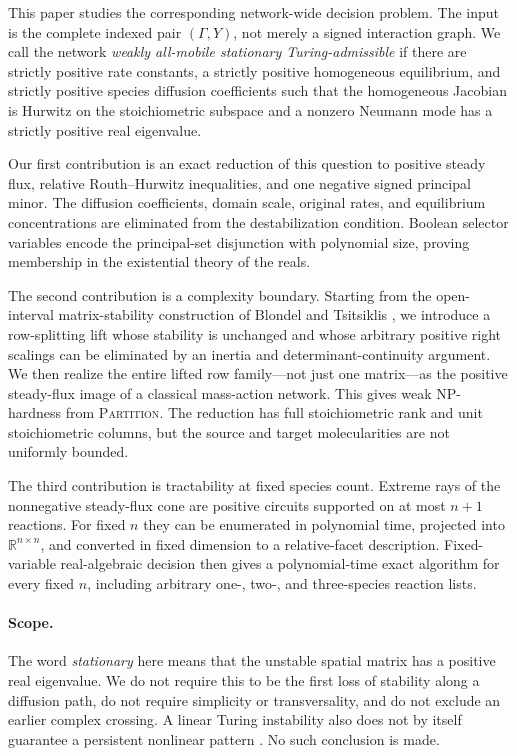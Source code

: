 \documentclass[11pt]{article}
\theoremstyle{definition}
\newcommand{\R}{\mathbb R}
\begin{document}
This paper studies the corresponding network-wide decision problem.  The
input is the complete indexed pair $(\Gamma,Y)$, not merely a signed
interaction graph.  We call the network \emph{weakly all-mobile stationary
Turing-admissible} if there are strictly positive rate constants, a strictly
positive homogeneous equilibrium, and strictly positive species diffusion
coefficients such that the homogeneous Jacobian is Hurwitz on the
stoichiometric subspace and a nonzero Neumann mode has a strictly positive real
eigenvalue.

Our first contribution is an exact reduction of this question to positive
steady flux, relative Routh--Hurwitz inequalities, and one negative signed
principal minor.  The diffusion coefficients, domain scale, original rates,
and equilibrium concentrations are eliminated from the destabilization
condition.  Boolean selector variables encode the principal-set disjunction
with polynomial size, proving membership in the existential theory of the
reals.

The second contribution is a complexity boundary.  Starting from the
open-interval matrix-stability construction of Blondel and Tsitsiklis
\cite{BlondelTsitsiklis1997}, we introduce a row-splitting lift whose stability
is unchanged and whose arbitrary positive right scalings can be eliminated by
an inertia and determinant-continuity argument.  We then realize the entire
lifted row family---not just one matrix---as the positive steady-flux image of
a classical mass-action network.  This gives weak NP-hardness from
\textsc{Partition}.  The reduction has full stoichiometric rank and unit
stoichiometric columns, but the source and target molecularities are not
uniformly bounded.

The third contribution is tractability at fixed species count.  Extreme rays
of the nonnegative steady-flux cone are positive circuits supported on at most
$n+1$ reactions.  For fixed $n$ they can be enumerated in polynomial time,
projected into $\R^{n\times n}$, and converted in fixed dimension to a
relative-facet description.  Fixed-variable real-algebraic decision then gives
a polynomial-time exact algorithm for every fixed $n$, including arbitrary
one-, two-, and three-species reaction lists.

\paragraph{Scope.}
The word \emph{stationary} here means that the unstable spatial matrix has a
positive real eigenvalue.  We do not require this to be the first loss of
stability along a diffusion path, do not require simplicity or transversality,
and do not exclude an earlier complex crossing.  A linear Turing instability
also does not by itself guarantee a persistent nonlinear pattern
\cite{Krause2024}.  No such conclusion is made.
\end{document}
